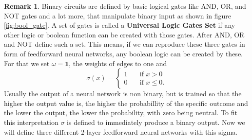 \documentclass{article}
\theoremstyle{definition}
\newtheorem{remark}[theorem]{Remark}
\begin{document}
\begin{remark}
Binary circuits are defined by basic logical gates like AND, OR, and NOT gates and a lot more, that manipulate binary input as shown in figure \ref{fig:bool_gate}. A set of gates is called a \textbf{Universal Logic Gates Set} if any other logic or boolean function can be created with those gates. After \cite{quine1955way} AND, OR and NOT define such a set. This means, if we can reproduce these three gates in form of feedforward neural networks, any boolean logic can be created by these. For that we set $\omega=\mathds{1}$, the weights of edges to one and
\[ \sigma(x) = 
  \begin{cases}
    1       & \quad \text{if } x > 0\\
    0  		& \quad \text{if } x \leq 0.
  \end{cases}
\]
Usually the output of a neural network is non binary, but is trained so that the higher the output value is, the higher the probabillity of the specific outcome and the lower the output, the lower the probability, with zero being neutral. To fit this interpretation $\sigma$ is defined to immediately produce a binary output. Now we will define three different $2$-layer feedforward neural networks with this sigma.



\end{remark}
\end{document}
